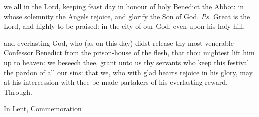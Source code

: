 %

\clearpage
{}


\introit
 we all in the Lord, keeping feast day in honour of holy Benedict the Abbot: in whose solemnity the Angels rejoice, and glorify the Son of God. \textit{Ps.} Great is the Lord, and highly to be praised: in the city of our God, even upon his holy hill.

\collect
{} and everlasting God, who (as on this day) didst release thy most venerable Confessor Benedict from the prison-house of the flesh, that thou mightest lift him up to heaven: we beseech thee, grant unto us thy servants who keep this festival the pardon of all our sins: that we, who with glad hearts rejoice in his glory, may at his intercession with thee be made partakers of his everlasting reward. Through.
\begin{rubric}
    In Lent, Commemoration 
\end{rubric}

